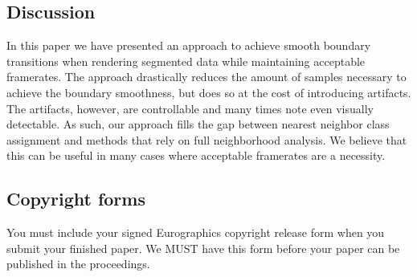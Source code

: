 \documentclass{egpubl}
\begin{document}
\subsection{Discussion}

In this paper we have presented an approach to achieve smooth boundary transitions when rendering segmented data while maintaining acceptable framerates. The approach drastically reduces the amount of samples necessary to achieve the boundary smoothness, but does so at the cost of introducing artifacts. The artifacts, however, are controllable and many times note even visually detectable. As such, our approach fills the gap between nearest neighbor class assignment and methods that rely on full neighborhood analysis. We believe that this can be useful in many cases where acceptable framerates are a necessity.


\subsection{Copyright forms}

You must include your signed Eurographics copyright release form
when you submit your finished paper. We MUST have this form before
your paper can be published in the proceedings.





\end{document}
